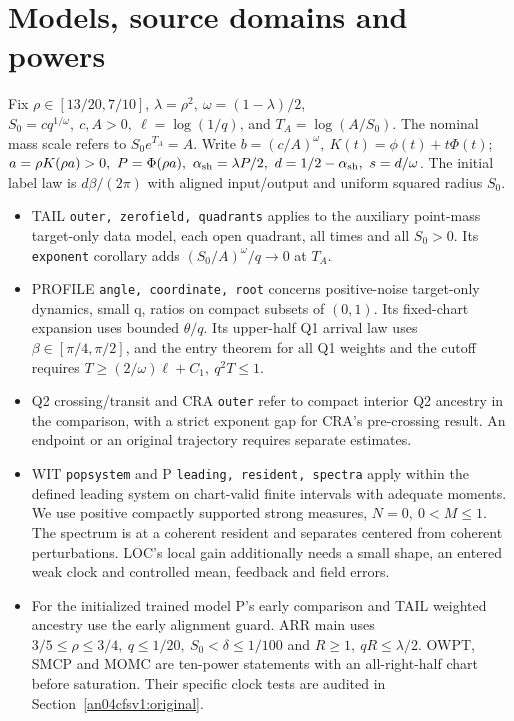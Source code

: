 \documentclass[11pt]{article}
\begin{document}
\section{Models, source domains and powers}\label{an04cfsv1:scope}
Fix \(\rho\in[13/20,7/10]\), \(\lambda=\rho^2,\ \omega=(1-\lambda)/2\),
\(S_0=cq^{1/\omega},\ c,A>0,\ \ell=\log(1/q)\), and
\(T_A=\log(A/S_0)\). The nominal mass scale refers to \(S_0e^{T_A}=A\).
Write \(b=(c/A)^\omega,\ K(t)=\phi(t)+t\Phi(t)\);
\(a=\rho K(\rho a)>0,\ P=\Phi(\rho a),\
\alpha_{\rm sh}=\lambda P/2,\ d=1/2-\alpha_{\rm sh},\ s=d/\omega\).
The initial label law is \(d\beta/(2\pi)\) with aligned input/output and
uniform squared radius \(S_0\).
\begin{itemize}
\item TAIL \texttt{outer, zerofield, quadrants} applies to the auxiliary
point-mass target-only data model, each open quadrant, all times and
all \(S_0>0\). Its \texttt{exponent} corollary adds
\((S_0/A)^\omega/q\to0\) at \(T_A\).
\item PROFILE \texttt{angle, coordinate, root} concerns positive-noise
target-only dynamics, small q, ratios on compact subsets of \((0,1)\).
Its fixed-chart expansion uses bounded \(\theta/q\). Its upper-half
Q1 arrival law uses \(\beta\in[\pi/4,\pi/2]\), and the entry theorem
for all Q1 weights and the cutoff requires
\(T\ge(2/\omega)\ell+C_1,\ q^2T\le1\).
\item Q2 crossing/transit and CRA \texttt{outer} refer to compact
interior Q2 ancestry in the comparison, with a strict exponent gap for
CRA's pre-crossing result. An endpoint or an original trajectory
requires separate estimates.
\item WIT \texttt{popsystem} and P \texttt{leading, resident, spectra}
apply within the defined leading system on chart-valid finite
intervals with adequate moments. We use positive compactly supported
strong measures, \(N=0,\ 0<M\le1\). The spectrum is at a coherent
resident and separates centered from coherent perturbations.
LOC's local gain additionally needs a small shape, an entered weak
clock and controlled mean, feedback and field errors.
\item For the initialized trained model P's early comparison and
TAIL weighted ancestry use the early alignment guard. ARR main uses
\(3/5\le\rho\le3/4,\ q\le1/20,\ S_0<\delta\le1/100\) and
\(R\ge1,\ qR\le\lambda/2\). OWPT, SMCP and MOMC are ten-power
statements with an all-right-half chart before saturation. Their
specific clock tests are audited in Section~\ref{an04cfsv1:original}.
\end{itemize}
\end{document}
